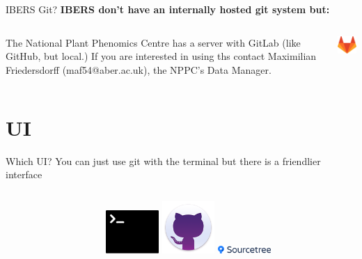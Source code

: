 \documentclass[10pt]{beamer}
\begin{document}
{\begin{frame}[fragile]{IBERS Git?}
\textbf{IBERS don't have an internally hosted git system but:} \newline \newline
\begin{columns}[T]
\begin{column}{.8\textwidth}
\alert<1>{The National Plant Phenomics Centre has a server with GitLab (like GitHub, but local.)}\pause \newline \newline
If you are interested in using ths contact Maximilian Friedersdorff (maf54@aber.ac.uk), the NPPC's Data Manager.
\end{column}
\begin{column}{.2\textwidth}
\includegraphics[width=2cm]{Figs/GitLab}
\end{column}
\end{columns}
\end{frame}

\section{UI}



\begin{frame}[fragile]{Which UI?}
You can just use git with the terminal but there is a friendlier interface\\
\begin{columns}[T]
\begin{column}{.8\textwidth}
\end{column}
\begin{column}{.2\textwidth}
\includegraphics[width=2cm]{Figs/git/terminal} \newline \newline
\includegraphics[width=2cm]{Figs/git/gitdesktop} \newline \newline
\includegraphics[width=2cm]{Figs/git/Sourcetree}
\end{column}
\end{columns}
\end{frame}


}
\end{document}
